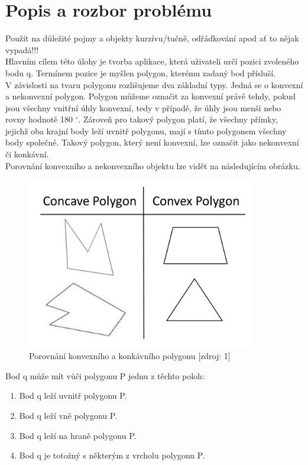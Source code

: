 \documentclass[a4paper, 12pt]{article}
\begin{document}
\section{Popis a rozbor problému}
Použít na důležité pojmy a objekty kurzívu/tučně, odřádkování apod ať to nějak vypadá!!!\\

Hlavním cílem této úlohy je tvorba aplikace, která uživateli určí pozici zvoleného bodu q. Termínem pozice je myšlen polygon, kterému zadaný bod přísluší.
\\

V závislosti na tvaru polygonu rozlišujeme dva základní typy. Jedná se o konvexní a nekonvexní polygon. Polygon můžeme označit za konvexní právě tehdy, pokud jsou všechny vnitřní úhly konvexní, tedy v případě, že úhly jsou menší nebo rovny hodnotě 180 $^\circ$. Zároveň pro takový polygon platí, že všechny přímky, jejichž oba krajní body leží uvnitř polygonu, mají s tímto polygonem všechny body společné. Takový polygon, který není konvexní, lze označit jako nekonvexní či konkávní.
\\

Porovnání konvexního a nekonvexního objektu lze vidět na následujícím obrázku.
\begin{figure}[h]
	\centering
	\includegraphics[width=10cm]{typy_polygonu.jpg}
	\caption{Porovnání konvexního a konkávního polygonu [zdroj: 1]}
\end{figure}

Bod q může mít vůči polygonu P jednu z těchto poloh:
\begin{enumerate}
\item Bod q leží uvnitř polygonu P.
\item Bod q leží vně polygonu P.
\item Bod q leží na hraně polygonu P.
\item Bod q je totožný s některým z vrcholu polygonu P.
\end{enumerate}
\end{document}
